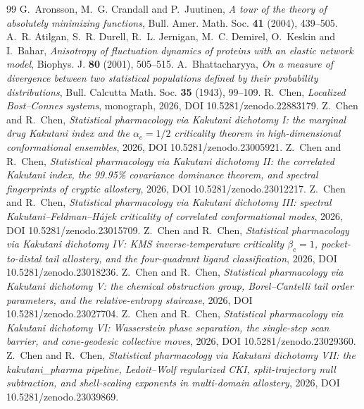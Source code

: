 \documentclass[11pt,reqno]{amsart}
\theoremstyle{plain}
\theoremstyle{definition}
\theoremstyle{remark}
\numberwithin{equation}{section}
\begin{document}
\begin{thebibliography}{99}
 G.~Aronsson, M.~G. Crandall and P.~Juutinen, \emph{A tour of the theory of absolutely minimizing functions}, Bull. Amer. Math. Soc. \textbf{41} (2004), 439--505.
 A.~R. Atilgan, S.~R. Durell, R.~L. Jernigan, M.~C. Demirel, O.~Keskin and I.~Bahar, \emph{Anisotropy of fluctuation dynamics of proteins with an elastic network model}, Biophys. J. \textbf{80} (2001), 505--515.
 A.~Bhattacharyya, \emph{On a measure of divergence between two statistical populations defined by their probability distributions}, Bull. Calcutta Math. Soc. \textbf{35} (1943), 99--109.
 R.~Chen, \emph{Localized Bost--Connes systems}, monograph, 2026, DOI 10.5281/zenodo.22883179.
 Z.~Chen and R.~Chen, \emph{Statistical pharmacology via Kakutani dichotomy I: the marginal drug Kakutani index and the $\alpha_c=1/2$ criticality theorem in high-dimensional conformational ensembles}, 2026, DOI 10.5281/zenodo.23005921.
 Z.~Chen and R.~Chen, \emph{Statistical pharmacology via Kakutani dichotomy II: the correlated Kakutani index, the 99.95\% covariance dominance theorem, and spectral fingerprints of cryptic allostery}, 2026, DOI 10.5281/zenodo.23012217.
 Z.~Chen and R.~Chen, \emph{Statistical pharmacology via Kakutani dichotomy III: spectral Kakutani--Feldman--H\'ajek criticality of correlated conformational modes}, 2026, DOI 10.5281/zenodo.23015709.
 Z.~Chen and R.~Chen, \emph{Statistical pharmacology via Kakutani dichotomy IV: KMS inverse-temperature criticality $\beta_c=1$, pocket-to-distal tail allostery, and the four-quadrant ligand classification}, 2026, DOI 10.5281/zenodo.23018236.
 Z.~Chen and R.~Chen, \emph{Statistical pharmacology via Kakutani dichotomy V: the chemical obstruction group, Borel--Cantelli tail order parameters, and the relative-entropy staircase}, 2026, DOI 10.5281/zenodo.23027704.
 Z.~Chen and R.~Chen, \emph{Statistical pharmacology via Kakutani dichotomy VI: Wasserstein phase separation, the single-step scan barrier, and cone-geodesic collective moves}, 2026, DOI 10.5281/zenodo.23029360.
 Z.~Chen and R.~Chen, \emph{Statistical pharmacology via Kakutani dichotomy VII: the kakutani\_pharma pipeline, Ledoit--Wolf regularized CKI, split-trajectory null subtraction, and shell-scaling exponents in multi-domain allostery}, 2026, DOI 10.5281/zenodo.23039869.

\end{thebibliography}
\end{document}
